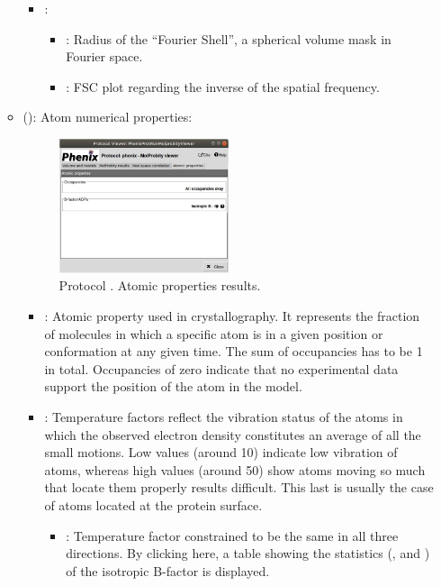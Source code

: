 \begin{itemize}
\begin{itemize}
\begin{itemize}
         \item {}:
          \begin{itemize}
           \item {}: Radius of the ``Fourier Shell'', a spherical volume mask in Fourier space.
           \item {}: FSC plot regarding the inverse of the spatial frequency.
          \end{itemize}
        \end{itemize}
      \item {} (): Atom numerical properties:
       \begin{figure}[H]
         \centering 
         \captionsetup{width=.9\linewidth} 
         \includegraphics[width=0.50\textwidth]{Images_appendix/Fig147.pdf}
         \caption{Protocol . Atomic properties results.}
         \label{fig:app_protocol_molprobity_5}
        \end{figure}
        \begin{itemize}
         \item {}: Atomic property used in crystallography. It represents the fraction of molecules in which a specific atom is in a given position or conformation at any given time. The sum of occupancies has to be 1 in total. Occupancies of zero indicate that no experimental data support the position of the atom in the model.
         \item {}: Temperature factors reflect the vibration status of the atoms in which the observed electron density constitutes an average of all the small motions. Low values (around 10) indicate low vibration of atoms, whereas high values (around 50) show atoms moving so much that locate them properly results difficult. This last is usually the case of atoms located at the protein surface.
          \begin{itemize}
           \item {}: Temperature factor constrained to be the same in all three directions. By clicking here, a table showing the statistics (,  and ) of the isotropic B-factor is displayed.
          \end{itemize}
        \end{itemize}
    \end{itemize}
    

\end{itemize}
